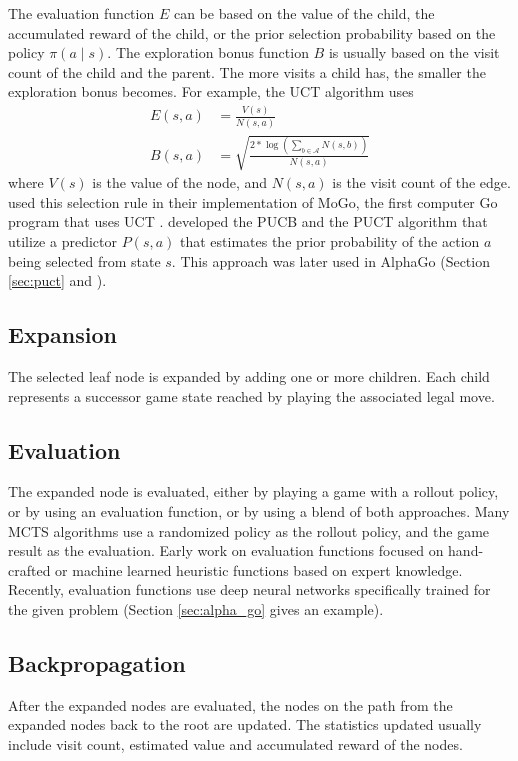 The evaluation function $E$ can be based on the value of the child, the accumulated reward of the child, or the prior selection probability based on the policy $\pi(a \mid s)$.
The exploration bonus function $B$ is usually based on the visit count of the child and the parent.
The more visits a child has, the smaller the exploration bonus becomes.
For example, the UCT algorithm uses
\begin{align*}
    E(s, a)  & = \frac{V(s)}{N(s, a)}  \\
    B(s, a)  & = \sqrt{\frac{2 * \log(\sum_{b \in \mathcal{A}}N(s, b))}{N(s, a)}}
\end{align*}
where $V(s)$ is the value of the node, and $N(s, a)$ is the visit count of the edge.
\citeauthor{ModificationUCTPatterns_Gelly.Wang.ea_2006} used this selection rule in their implementation of MoGo,
the first computer Go program that uses UCT \cite{ModificationUCTPatterns_Gelly.Wang.ea_2006}.
\citeauthor{MultiarmedBanditsEpisode_Rosin_2011} developed the PUCB and the PUCT algorithm that utilize a predictor $P(s, a)$ that estimates the prior probability of the action $a$ being selected from state $s$.
This approach was later used in AlphaGo (Section \ref{sec:puct} and \cite{MultiarmedBanditsEpisode_Rosin_2011}).

\subsection{Expansion}
The selected leaf node is expanded by adding one or more children.
Each child represents a successor game state reached by playing the associated legal move.

\subsection{Evaluation}
The expanded node is evaluated, either by playing a game with a rollout policy, or by using an evaluation function, or by using a blend of both approaches.
Many MCTS algorithms use a randomized policy as the rollout policy, and the game result as the evaluation.
Early work on evaluation functions focused on hand-crafted or machine learned heuristic functions based on expert knowledge.
Recently, evaluation functions use deep neural networks specifically trained for the given problem (Section \ref{sec:alpha_go} gives an example).

\subsection{Backpropagation}
After the expanded nodes are evaluated, the nodes on the path from the expanded nodes back to the root are updated.
The statistics updated usually include visit count, estimated value and accumulated reward of the nodes.


